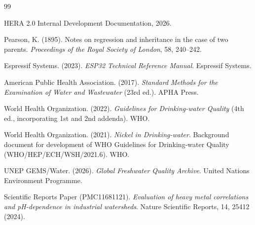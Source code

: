 \documentclass[12pt,a4paper]{article}
\begin{document}
\begin{thebibliography}{99}

HERA 2.0 Internal Development Documentation, 2026.

Pearson, K. (1895). Notes on regression and inheritance in the case of two parents. \textit{Proceedings of the Royal Society of London}, 58, 240--242.

Espressif Systems. (2023). \textit{ESP32 Technical Reference Manual}. Espressif Systems.

American Public Health Association. (2017). \textit{Standard Methods for the Examination of Water and Wastewater} (23rd ed.). APHA Press.

World Health Organization. (2022). \textit{Guidelines for Drinking-water Quality} (4th ed., incorporating 1st and 2nd addenda). WHO.

World Health Organization. (2021). \textit{Nickel in Drinking-water}. Background document for development of WHO Guidelines for Drinking-water Quality (WHO/HEP/ECH/WSH/2021.6). WHO.

UNEP GEMS/Water. (2026). \textit{Global Freshwater Quality Archive}. United Nations Environment Programme.

Scientific Reports Paper (PMC11681121). \textit{Evaluation of heavy metal correlations and pH-dependence in industrial watersheds}. Nature Scientific Reports, 14, 25412 (2024).

\end{thebibliography}
\end{document}
